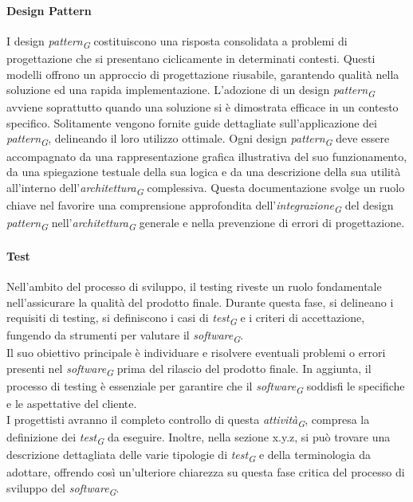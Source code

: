 \paragraph{Design Pattern}
I design \textit{pattern}\textsubscript{\textit{G}} costituiscono una risposta consolidata a problemi di progettazione che si presentano ciclicamente in determinati contesti. Questi modelli offrono un approccio di progettazione riusabile, garantendo qualità nella soluzione ed una rapida implementazione.
L'adozione di un design \textit{pattern}\textsubscript{\textit{G}} avviene soprattutto quando una soluzione si è dimostrata efficace in un contesto specifico. Solitamente vengono fornite guide dettagliate sull'applicazione dei \textit{pattern}\textsubscript{\textit{G}}, delineando il loro utilizzo ottimale.
Ogni design \textit{pattern}\textsubscript{\textit{G}} deve essere accompagnato da una rappresentazione grafica illustrativa del suo funzionamento, da una spiegazione testuale della sua logica e da una descrizione della sua utilità all'interno dell'\textit{architettura}\textsubscript{\textit{G}} complessiva. Questa documentazione svolge un ruolo chiave nel favorire una comprensione approfondita dell'\textit{integrazione}\textsubscript{\textit{G}} del design \textit{pattern}\textsubscript{\textit{G}} nell'\textit{architettura}\textsubscript{\textit{G}} generale e nella prevenzione di errori di progettazione.

\paragraph{Test}
Nell'ambito del processo di sviluppo, il testing riveste un ruolo fondamentale nell'assicurare la qualità del prodotto finale. Durante questa fase, si delineano i requisiti di testing, si definiscono i casi di \textit{test}\textsubscript{\textit{G}} e i criteri di accettazione, fungendo da strumenti per valutare il \textit{software}\textsubscript{\textit{G}}. \\
Il suo obiettivo principale è individuare e risolvere eventuali problemi o errori presenti nel \textit{software}\textsubscript{\textit{G}} prima del rilascio del prodotto finale. In aggiunta, il processo di testing è essenziale per garantire che il \textit{software}\textsubscript{\textit{G}} soddisfi le specifiche e le aspettative del cliente. \\
I progettisti avranno il completo controllo di questa \textit{attività}\textsubscript{\textit{G}}, compresa la definizione dei \textit{test}\textsubscript{\textit{G}} da eseguire. Inoltre, nella sezione x.y.z, si può trovare una descrizione dettagliata delle varie tipologie di \textit{test}\textsubscript{\textit{G}} e della terminologia da adottare, offrendo così un'ulteriore chiarezza su questa fase critica del processo di sviluppo del \textit{software}\textsubscript{\textit{G}}.

